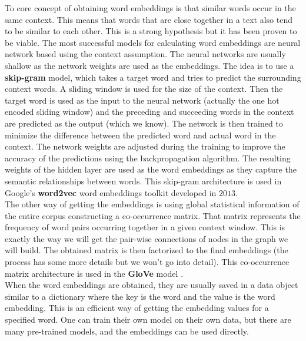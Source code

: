 \documentclass[12pt]{article}
\numberwithin{equation}{section}
\begin{document}
\begin{spacing}{1.5}
	To core concept of obtaining word embeddings is that similar words occur in the same context. This means that words that are close together in a text also tend to be similar to each other. This is a strong hypothesis but it has been proven to be viable. The most successful models for calculating word embeddings are neural network based using the context assumption. The neural networks are usually shallow as the network weights are used as the embeddings. The idea is to use a \textbf{skip-gram} model, which takes a target word and tries to predict the surrounding context words. A sliding window is used for the size of the context. Then the target word is used as the input to the neural network (actually the one hot encoded sliding window) and the preceding and succeeding words in the context are predicted as the output (which we know). The network is then trained to minimize the difference between the predicted word and actual word in the context. The network weights are adjusted during the training to improve the accuracy of the predictions using the backpropagation algorithm. The resulting weights of the hidden layer are used as the word embeddings as they capture the semantic relationships between words. This skip-gram architecture is used in Google's \textbf{word2vec} word embeddings toolkit \cite{word2vec} developed in $2013$. \\
	
	The other way of getting the embeddings is using global statistical information of the entire corpus constructing a co-occurrence matrix. That matrix represents the frequency of word pairs occurring together in a given context window. This is exactly the way we will get the pair-wise connections of nodes in the graph we will build. The obtained matrix is then factorized to the final embeddings (the process has some more details but we won't go into detail). This co-occurrence matrix architecture is used in the \textbf{GloVe} model \cite{glove}. \\
	
	When the word embeddings are obtained, they are usually saved in a data object similar to a dictionary where the key is the word and the value is the word embedding. This is an efficient way of getting the embedding values for a specified word. One can train their own model on their own data, but there are many pre-trained models, and the embeddings can be used directly.\\
	

\end{spacing}
\end{document}
